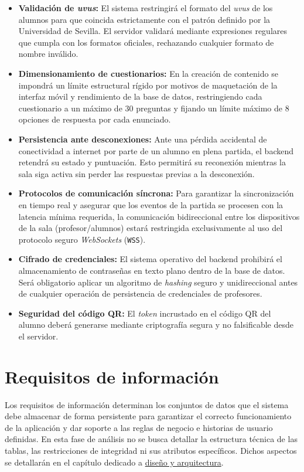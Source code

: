 \begin{itemize}
    \item \textbf{Validación de \textit{uvus}:} El sistema restringirá el formato del \textit{uvus} de los alumnos para que coincida estrictamente con el patrón definido por la Universidad de Sevilla. El servidor validará mediante expresiones regulares que cumpla con los formatos oficiales, rechazando cualquier formato de nombre inválido.
    \item \textbf{Dimensionamiento de cuestionarios:} En la creación de contenido se impondrá un límite estructural rígido por motivos de maquetación de la interfaz móvil y rendimiento de la base de datos, restringiendo cada cuestionario a un máximo de 30 preguntas y fijando un límite máximo de 8 opciones de respuesta por cada enunciado.
    \item \textbf{Persistencia ante desconexiones:} Ante una pérdida accidental de conectividad a internet por parte de un alumno en plena partida, el backend retendrá su estado y puntuación. Esto permitirá su reconexión mientras la sala siga activa sin perder las respuestas previas a la desconexión.
    \item \textbf{Protocolos de comunicación síncrona:} Para garantizar la sincronización en tiempo real y asegurar que los eventos de la partida se procesen con la latencia mínima requerida, la comunicación bidireccional entre los dispositivos de la sala (profesor/alumnos) estará restringida exclusivamente al uso del protocolo seguro \textit{WebSockets} (\texttt{WSS}).
    \item \textbf{Cifrado de credenciales:} El sistema operativo del backend prohibirá el almacenamiento de contraseñas en texto plano dentro de la base de datos. Será obligatorio aplicar un algoritmo de \textit{hashing} seguro y unidireccional antes de cualquier operación de persistencia de credenciales de profesores.
    \item \textbf{Seguridad del código QR:} El \textit{token} incrustado en el código QR del alumno deberá generarse mediante criptografía segura y no falsificable desde el servidor. 
\end{itemize}

\section{Requisitos de información}\label{sec:requisitos_de_informacion}

Los requisitos de información determinan los conjuntos de datos que el sistema debe almacenar de forma persistente para garantizar el correcto funcionamiento de la aplicación y dar soporte a las reglas de negocio e historias de usuario definidas. En esta fase de análisis no se busca detallar la estructura técnica de las tablas, las restricciones de integridad ni sus atributos específicos. Dichos aspectos se detallarán en el capítulo dedicado a \hyperref[cap:diseno_y_arquitectura]{diseño y arquitectura}.

